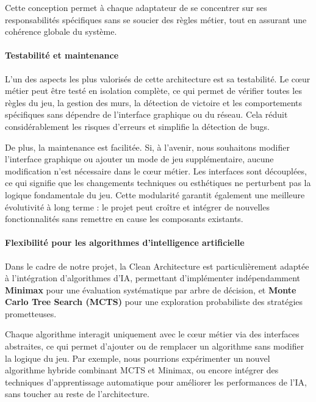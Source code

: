 \documentclass[a4paper]{article}
\begin{document}
Cette conception permet à chaque adaptateur de se concentrer sur ses responsabilités spécifiques sans se soucier des règles métier, tout en assurant une cohérence globale du système.

\paragraph{Testabilité et maintenance}

L’un des aspects les plus valorisés de cette architecture est sa testabilité. Le cœur métier peut être testé en isolation complète, ce qui permet de vérifier toutes les règles du jeu, la gestion des murs, la détection de victoire et les comportements spécifiques sans dépendre de l’interface graphique ou du réseau. Cela réduit considérablement les risques d’erreurs et simplifie la détection de bugs.

De plus, la maintenance est facilitée. Si, à l’avenir, nous souhaitons modifier l’interface graphique ou ajouter un mode de jeu supplémentaire, aucune modification n’est nécessaire dans le cœur métier. Les interfaces sont découplées, ce qui signifie que les changements techniques ou esthétiques ne perturbent pas la logique fondamentale du jeu. Cette modularité garantit également une meilleure évolutivité à long terme : le projet peut croître et intégrer de nouvelles fonctionnalités sans remettre en cause les composants existants.

\paragraph{Flexibilité pour les algorithmes d’intelligence artificielle}

Dans le cadre de notre projet, la Clean Architecture est particulièrement adaptée à l’intégration d’algorithmes d’IA, permettant d’implémenter indépendamment \textbf{Minimax} pour une évaluation systématique par arbre de décision, et \textbf{Monte Carlo Tree Search (MCTS)} pour une exploration probabiliste des stratégies prometteuses.

Chaque algorithme interagit uniquement avec le cœur métier via des interfaces abstraites, ce qui permet d’ajouter ou de remplacer un algorithme sans modifier la logique du jeu. Par exemple, nous pourrions expérimenter un nouvel algorithme hybride combinant MCTS et Minimax, ou encore intégrer des techniques d’apprentissage automatique pour améliorer les performances de l’IA, sans toucher au reste de l’architecture.

\paragraph{}
\end{document}

